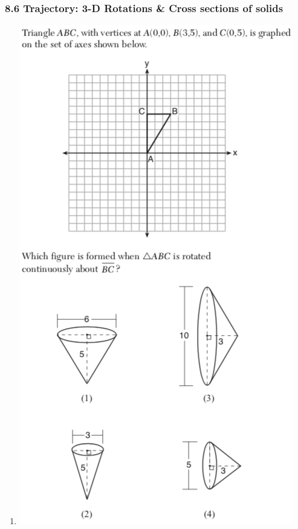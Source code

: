 \documentclass[12pt, twoside]{article}
\begin{document}
\subsubsection*{8.6 Trajectory: 3-D Rotations \& Cross sections of solids} %
 \begin{enumerate}

  \item %
    \includegraphics[scale=0.75]{triangle_3d_rotation_JN2018.png}


\end{enumerate}
\end{document}
